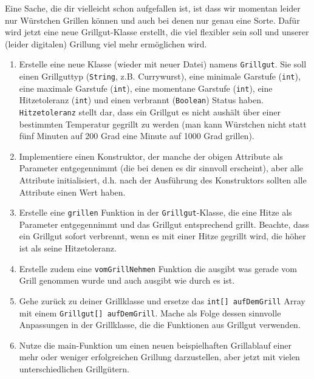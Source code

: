 \documentclass{../../sheet}
\begin{document}
\newpage
{}
Eine Sache, die dir vielleicht schon aufgefallen ist, ist dass wir momentan leider nur Würstchen Grillen können und auch bei denen nur genau eine Sorte. Dafür wird jetzt eine neue Grillgut-Klasse erstellt, die viel flexibler sein soll und unserer (leider digitalen) Grillung viel mehr ermöglichen wird.
\begin{enumerate}
    \item Erstelle eine neue Klasse (wieder mit neuer Datei) namens \texttt{Grillgut}. Sie soll einen Grillguttyp (\texttt{String}, z.B. Currywurst), eine minimale Garstufe (\texttt{int}), eine maximale Garstufe (\texttt{int}), eine momentane Garstufe (\texttt{int}), eine Hitzetoleranz (\texttt{int}) und einen verbrannt (\texttt{Boolean}) Status haben. \texttt{Hitzetoleranz} stellt dar, dass ein Grillgut es nicht aushält über einer bestimmten Temperatur gegrillt zu werden (man kann Würstchen nicht statt fünf Minuten auf 200 Grad eine Minute auf 1000 Grad grillen). 
    \item Implementiere einen Konstruktor, der manche der obigen Attribute als Parameter entgegennimmt (die bei denen es dir sinnvoll erscheint), aber alle Attribute initialisiert, d.h. nach der Ausführung des Konstruktors sollten alle Attribute einen Wert haben.
    \item Erstelle eine \texttt{grillen} Funktion in der \texttt{Grillgut}-Klasse, die eine Hitze als Parameter entgegennimmt und das Grillgut entsprechend grillt. Beachte, dass ein Grillgut sofort verbrennt, wenn es mit einer Hitze gegrillt wird, die höher ist als seine Hitzetoleranz.
    \item Erstelle zudem eine \texttt{vomGrillNehmen} Funktion die ausgibt was gerade vom Grill genommen wurde und auch ausgibt wie durch es ist.
    \item Gehe zurück zu deiner Grillklasse und ersetze das \texttt{int[] aufDemGrill} Array mit einem \texttt{Grillgut[] aufDemGrill}. Mache als Folge dessen sinnvolle Anpassungen in der Grillklasse, die die Funktionen aus Grillgut verwenden.
    \item Nutze die main-Funktion um einen neuen beispielhaften Grillablauf einer mehr oder weniger erfolgreichen
    Grillung darzustellen, aber jetzt mit vielen unterschiedlichen Grillgütern.
\end{enumerate}
\end{document}
